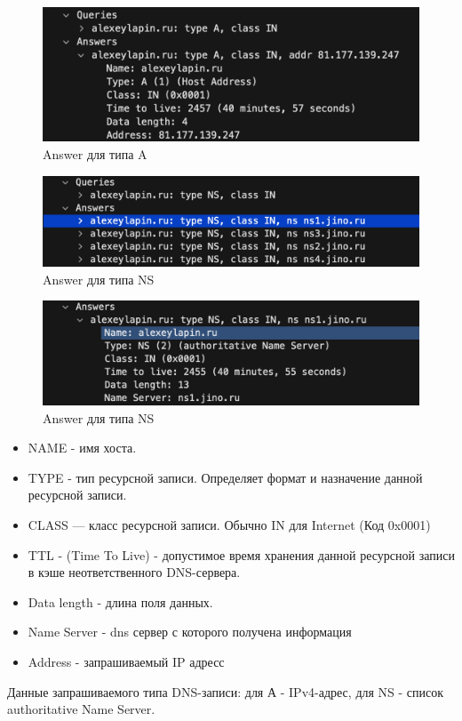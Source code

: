 \documentclass[12pt,onecolumn]{article}
\begin{document}
\begin{itemize}
{        \begin{figure}[H]
            \centering
            \includegraphics*[width=\textwidth]{image/part6/respA.png}
            \caption{Answer для типа A}
        \end{figure}
        \begin{figure}[H]
            \centering
            \includegraphics*[width=\textwidth]{image/part6/respNS.png}
            \caption{Answer для типа NS}
        \end{figure}
        \begin{figure}[H]
            \centering
            \includegraphics*[width=\textwidth]{image/part6/respNS2.png}
            \caption{Answer для типа NS}
        \end{figure}
        \begin{itemize}
            \item NAME - имя хоста.
            \item TYPE - тип ресурсной записи. Определяет формат и назначение данной
            ресурсной записи.
            \item CLASS — класс ресурсной записи. Обычно IN для Internet (Код 0x0001)
            \item TTL - (Time To Live) - допустимое время хранения данной ресурсной записи в кэше неответственного DNS-сервера.
            \item Data length - длина поля данных.
            \item Name Server - dns сервер с которого получена информация
            \item Address - запрашиваемый IP адресс
        \end{itemize}
        Данные запрашиваемого типа DNS-записи: для А - IPv4-адрес, для NS - список
authoritative Name Server.
        
}
\end{itemize}
\end{document}
